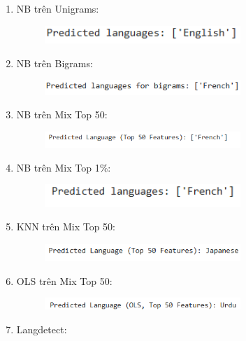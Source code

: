 \begin{enumerate}
    \item NB trên Unigrams:
    \begin{figure}[H]
    \centering
    \includegraphics[width=0.7\textwidth]{img/docspics/Picture70.png}
\end{figure}
    \item NB trên Bigrams:
    \begin{figure}[H]
    \centering
    \includegraphics[width=0.7\textwidth]{img/docspics/Picture71.png}
\end{figure}
    \item NB trên Mix Top 50:
    \begin{figure}[H]
    \centering
    \includegraphics[width=0.7\textwidth]{img/docspics/Picture72.png}
\end{figure}
    \item NB trên Mix Top 1\%:
    \begin{figure}[H]
    \centering
    \includegraphics[width=0.7\textwidth]{img/docspics/Picture73.png}
\end{figure}
    \item KNN trên Mix Top 50:
    \begin{figure}[H]
    \centering
    \includegraphics[width=0.7\textwidth]{img/docspics/Picture74.png}
\end{figure}
    \item OLS trên Mix Top 50:
    \begin{figure}[H]
    \centering
    \includegraphics[width=0.7\textwidth]{img/docspics/Picture75.png}
\end{figure}
    \item Langdetect:

\end{enumerate}
